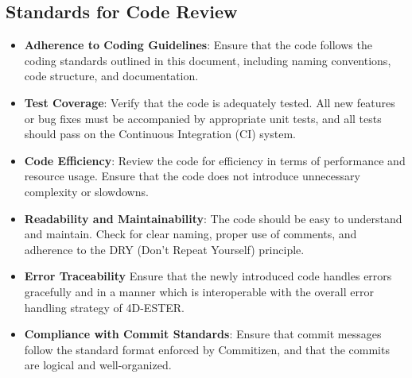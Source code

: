 \documentclass{ol-softwaremanual}
\begin{document}
\subsection{Standards for Code Review}
\begin{itemize}
    \item \textbf{Adherence to Coding Guidelines}: Ensure that the code follows the coding standards outlined in this document, including naming conventions, code structure, and documentation.
    \item \textbf{Test Coverage}: Verify that the code is adequately tested. All new features or bug fixes must be accompanied by appropriate unit tests, and all tests should pass on the Continuous Integration (CI) system.
    \item \textbf{Code Efficiency}: Review the code for efficiency in terms of performance and resource usage. Ensure that the code does not introduce unnecessary complexity or slowdowns.
    \item \textbf{Readability and Maintainability}: The code should be easy to understand and maintain. Check for clear naming, proper use of comments, and adherence to the DRY (Don’t Repeat Yourself) principle.
    \item \textbf{Error Traceability} Ensure that the newly introduced code handles errors gracefully and in a manner which is interoperable with the overall error handling strategy of 4D-ESTER.
    \item \textbf{Compliance with Commit Standards}: Ensure that commit messages follow the standard format enforced by Commitizen, and that the commits are logical and well-organized.
\end{itemize}
\end{document}

